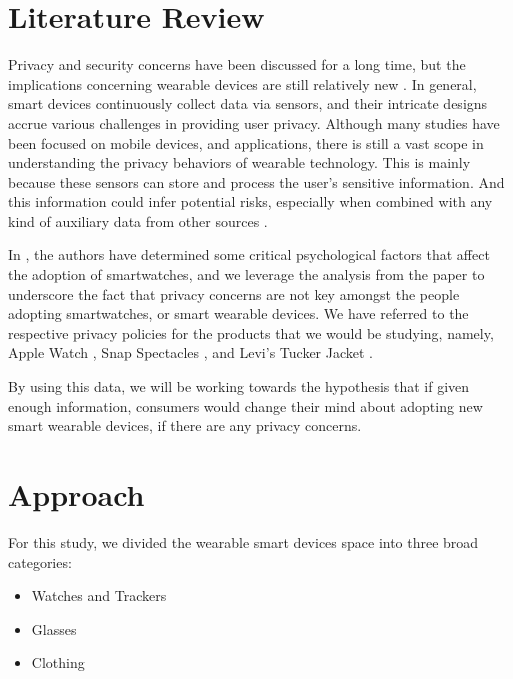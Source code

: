 \documentclass[sigconf]{acmart}
\begin{document}
\section{Literature Review} \label{literatureReview}

Privacy and security concerns have been discussed for a long time, but the implications concerning wearable devices are still relatively new \cite{Mancini:2009:SPE:1620545.1620547}. In general, smart devices continuously collect data via sensors, and their intricate designs accrue various challenges in providing user privacy. Although many studies have been focused on mobile devices, and applications, there is still a vast scope in understanding the privacy behaviors of wearable technology\cite{TROSHYNSKI2011}\cite{Hoyle:2014:PBL:2632048.2632079}. This is mainly because these sensors can store and process the user’s sensitive information. And this information could infer potential risks, especially when combined with any kind of auxiliary data from other sources \cite{Raij:2011:PRE:1978942.1978945}.

In \cite{doi:10.1080/10447318.2017.1357902}\cite{cite-key}, the authors have determined some critical psychological factors that affect the adoption of smartwatches, and we leverage the analysis from the paper to underscore the fact that privacy concerns are not key amongst the people adopting smartwatches, or smart wearable devices. We have referred to the respective privacy policies for the products that we would be studying, namely, Apple Watch \cite{apple-policy}, Snap Spectacles \cite{snap-policy}, and Levi’s Tucker Jacket \cite{levis-policy}.

By using this data, we will be working towards the hypothesis that if given enough information, consumers would change their mind about adopting new smart wearable devices, if there are any privacy concerns.


\section{Approach} \label{approach}

For this study, we divided the wearable smart devices space into three broad categories:
\begin{itemize}
    \item Watches and Trackers
    \item Glasses
    \item Clothing
\end{itemize}
\end{document}
